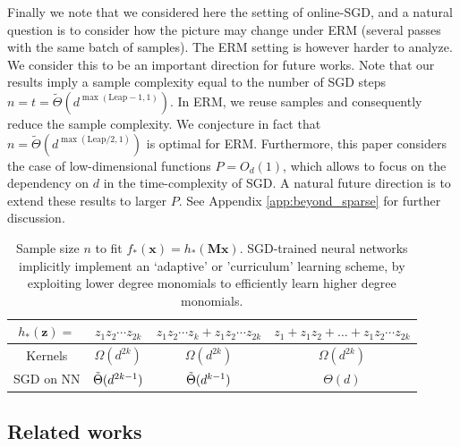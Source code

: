 \documentclass[11pt]{article}
\newcommand{\<}{\langle}
\renewcommand{\>}{\rangle}
\theoremstyle{definition}
\def\bM{{\boldsymbol M}}
\def\bx{{\boldsymbol x}}
\def\bz{{\boldsymbol z}}
\def\bz{{\boldsymbol z}}
\def\bx{{\boldsymbol x}}
\def\bz{{\boldsymbol z}}
\def\Leap{\mathrm{Leap}}
\begin{document}
Finally we note that we considered here the setting of online-SGD, and a natural question is to consider how the picture may change under ERM (several passes with the same batch of samples). The ERM setting is however harder to analyze. We consider this to be an important direction for future works. Note that our results imply a sample complexity equal to the number of SGD steps $n = t = \widetilde{\Theta} (d^{\max(\Leap - 1,1)})$. In ERM, we reuse samples and consequently reduce the sample complexity. We conjecture in fact that $n = \widetilde{\Theta} (d^{\max(\Leap /2, 1)})$ is optimal for ERM. Furthermore, this paper considers the case of low-dimensional functions $P = O_d(1)$, which allows to focus on the dependency on $d$ in the time-complexity of SGD. A natural future direction is to extend these results to larger $P$. See Appendix \ref{app:beyond_sparse} for further discussion.







\begin{table}[t!]
  \begin{center}
    \label{tab:table1}
    \def\arraystretch{1.2}
    \begin{tabular}{|c|c|c|c|} 
      \hline
      $h_* (\bz)=$ &  $ z_1 z_2 \cdots z_{2k} $ & $z_1 z_2 \cdots z_{k} + z_1z_2 \cdots z_{2k}$ & $ z_1 + z_1 z_2  + \ldots + z_1z_2 \cdots z_{2k} $ \\
      \hline
      Kernels & $ \Omega (d^{2k} )$ & $ \Omega (d^{2k} )$ & $ \Omega (d^{2k} )$ \\
      \hline
      SGD on NN & $ \Tilde \Theta (d^{2k-1})$ & $\Tilde \Theta (d^{k -1})$ & $\Theta (d )$  \\
      \hline
    \end{tabular}

        \caption{Sample size $n$ to fit $f_* (\bx) = h_* (\bM\bx)$. SGD-trained neural networks implicitly implement an `adaptive' or 'curriculum' learning scheme, by exploiting lower degree monomials to efficiently learn higher degree monomials.
        }\label{tab:comparison}
  \end{center}

\end{table}



\subsection{Related works}\label{related} 
\end{document}
